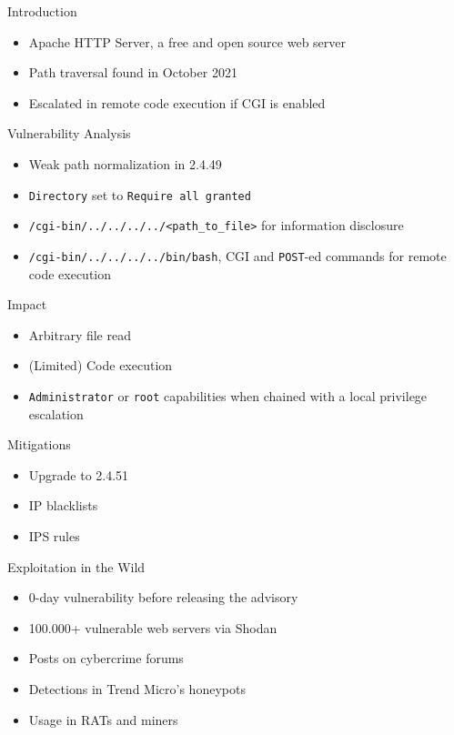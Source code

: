 \documentclass{beamer}
\begin{document}
\begin{frame}{Introduction} \pause
	\begin{itemize}
		\item Apache HTTP Server, a free and open source web server \pause
	    \item Path traversal found in October 2021 \pause
	    \item Escalated in remote code execution if CGI is enabled
	\end{itemize}
\end{frame}

\begin{frame}{Vulnerability Analysis} \pause
	\begin{itemize}
	    \item Weak path normalization in 2.4.49 \pause
		\item \texttt{Directory} set to \texttt{Require all granted} \pause
        \item \texttt{/cgi-bin/../../../../<path_to_file>} for information disclosure\pause
	    \item \texttt{/cgi-bin/../../../../bin/bash}, CGI and \texttt{POST}-ed commands for remote code execution
	\end{itemize}
\end{frame}

\begin{frame}{Impact} \pause
	\begin{itemize}
		\item Arbitrary file read \pause
	    \item (Limited) Code execution \pause
	    \item \texttt{Administrator} or \texttt{root} capabilities when chained with a local privilege escalation
	\end{itemize}
\end{frame}

\begin{frame}{Mitigations} \pause
	\begin{itemize}
		\item Upgrade to 2.4.51 \pause
	    \item IP blacklists \pause
	    \item IPS rules
	\end{itemize}
\end{frame}

\begin{frame}{Exploitation in the Wild} \pause
	\begin{itemize}
		\item 0-day vulnerability before releasing the advisory \pause
	    \item 100.000+ vulnerable web servers via Shodan \pause
	    \item Posts on cybercrime forums \pause
	    \item Detections in Trend Micro's honeypots \pause
	    \item Usage in RATs and miners
	\end{itemize}
\end{frame}
\end{document}
